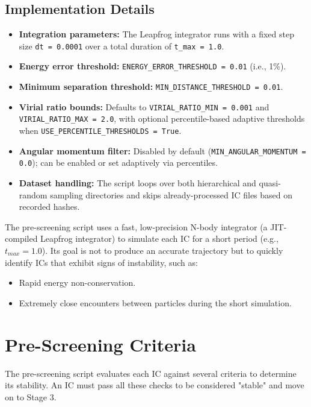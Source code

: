 \documentclass{article}
\begin{document}
\subsection*{Implementation Details}
\begin{itemize}
  \item \textbf{Integration parameters:} The Leapfrog integrator runs with a fixed step size \texttt{dt = 0.0001} over a total duration of \texttt{t\_max = 1.0}.
  \item \textbf{Energy error threshold:} \texttt{ENERGY\_ERROR\_THRESHOLD = 0.01} (i.e., 1\%).
  \item \textbf{Minimum separation threshold:} \texttt{MIN\_DISTANCE\_THRESHOLD = 0.01}.
  \item \textbf{Virial ratio bounds:} Defaults to \texttt{VIRIAL\_RATIO\_MIN = 0.001} and \texttt{VIRIAL\_RATIO\_MAX = 2.0}, with optional percentile-based adaptive thresholds when \texttt{USE\_PERCENTILE\_THRESHOLDS = True}.
  \item \textbf{Angular momentum filter:} Disabled by default (\texttt{MIN\_ANGULAR\_MOMENTUM = 0.0}); can be enabled or set adaptively via percentiles.
  \item \textbf{Dataset handling:} The script loops over both hierarchical and quasi-random sampling directories and skips already-processed IC files based on recorded hashes.
\end{itemize}
The pre-screening script uses a fast, low-precision N-body integrator (a JIT-compiled Leapfrog integrator) to simulate each IC for a short period (e.g., $t_{max}=1.0$). Its goal is not to produce an accurate trajectory but to quickly identify ICs that exhibit signs of instability, such as:
\begin{itemize}
    \item Rapid energy non-conservation.
    \item Extremely close encounters between particles during the short simulation.
\end{itemize}

\section{Pre-Screening Criteria}
The pre-screening script evaluates each IC against several criteria to determine its stability. An IC must pass all these checks to be considered "stable" and move on to Stage 3.
\end{document}
